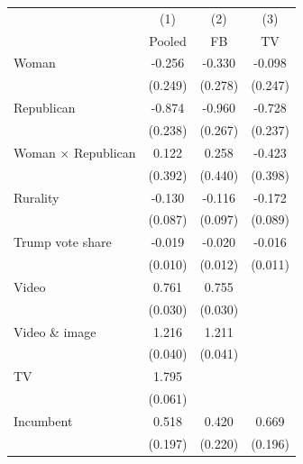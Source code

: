 \begin{tabular}{l*{3}{c}}
\toprule
                    &\multicolumn{1}{c}{(1)}&\multicolumn{1}{c}{(2)}&\multicolumn{1}{c}{(3)}\\
                    &\multicolumn{1}{c}{Pooled}&\multicolumn{1}{c}{FB}&\multicolumn{1}{c}{TV}\\
\midrule
Woman  &      -0.256         &      -0.330         &      -0.098         \\
                    &     (0.249)         &     (0.278)         &     (0.247)         \\
Republican     &      -0.874\sym{***}&      -0.960\sym{***}&      -0.728\sym{**} \\
                    &     (0.238)         &     (0.267)         &     (0.237)         \\
Woman $\times$ Republican&       0.122         &       0.258         &      -0.423         \\
                    &     (0.392)         &     (0.440)         &     (0.398)         \\
Rurality      &      -0.130         &      -0.116         &      -0.172         \\
                    &     (0.087)         &     (0.097)         &     (0.089)         \\
Trump vote share              &      -0.019         &      -0.020         &      -0.016         \\
                    &     (0.010)         &     (0.012)         &     (0.011)         \\
Video               &       0.761\sym{***}&       0.755\sym{***}&                     \\
                    &     (0.030)         &     (0.030)         &                     \\
Video \& image         &       1.216\sym{***}&       1.211\sym{***}&                     \\
                    &     (0.040)         &     (0.041)         &                     \\
TV                  &       1.795\sym{***}&                     &                     \\
                    &     (0.061)         &                     &                     \\
Incumbent                   &       0.518\sym{**} &       0.420         &       0.669\sym{***}\\
                    &     (0.197)         &     (0.220)         &     (0.196)         \\

\end{tabular}
